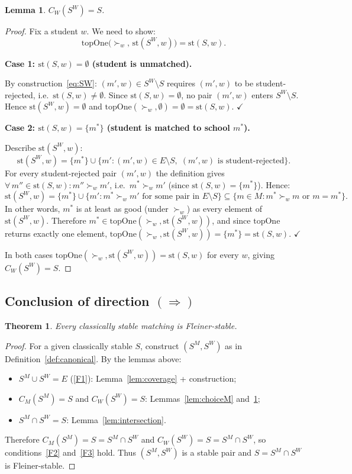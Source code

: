 \documentclass[12pt, a4paper]{article}
\theoremstyle{definition}
\theoremstyle{plain}
\newtheorem{theorem}[definition]{Theorem}
\newtheorem{lemma}[definition]{Lemma}
\theoremstyle{remark}
\newcommand{\CM}{C_M}
\newcommand{\CW}{C_W}
\newcommand{\SM}{S^M}
\newcommand{\SW}{S^W}
\newcommand{\stud}[2]{\mathrm{st}(#1,#2)}
\newcommand{\topOne}{\mathrm{topOne}}
\begin{document}
\begin{lemma}
\label{lem:choiceW}
$\CW(\SW) = S$.
\end{lemma}
\begin{proof}
Fix a student $w$. We need to show:
\[
  \topOne\bigl(\succ_w,\,\stud{\SW}{w}\bigr) = \stud{S}{w}.
\]

\textbf{Case 1: $\stud{S}{w} = \emptyset$ (student is unmatched).}

By construction~\eqref{eq:SW}: $(m', w) \in \SW \setminus S$ requires
$(m', w)$ to be student-rejected, i.e.\ $\stud{S}{w} \neq \emptyset$.
Since $\stud{S}{w} = \emptyset$, no pair $(m', w)$ enters $\SW \setminus S$.
Hence $\stud{\SW}{w} = \emptyset$ and
$\topOne(\succ_w, \emptyset) = \emptyset = \stud{S}{w}$. $\checkmark$

\textbf{Case 2: $\stud{S}{w} = \{m^*\}$ (student is matched to school $m^*$).}

Describe $\stud{\SW}{w}$:
\[
  \stud{\SW}{w} = \{m^*\} \cup
  \bigl\{m' : (m', w) \in E \setminus S,\;
  (m', w)\text{ is student-rejected}\bigr\}.
\]
For every student-rejected pair $(m', w)$ the definition gives
$\forall\, m'' \in \stud{S}{w} : m'' \succ_w m'$, i.e.\ $m^* \succ_w m'$
(since $\stud{S}{w} = \{m^*\}$). Hence:
\[
  \stud{\SW}{w}
  = \{m^*\} \cup \{m' : m^* \succ_w m'\text{ for some pair in }E \setminus S\}
  \subseteq \{m \in M : m^* \succ_w m \text{ or } m = m^*\}.
\]
In other words, $m^*$ is at least as good (under $\succ_w$) as every element
of $\stud{\SW}{w}$. Therefore $m^* \in \topOne(\succ_w, \stud{\SW}{w})$, and
since $\topOne$ returns exactly one element,
$\topOne(\succ_w, \stud{\SW}{w}) = \{m^*\} = \stud{S}{w}$. $\checkmark$

\medskip
In both cases $\topOne(\succ_w, \stud{\SW}{w}) = \stud{S}{w}$ for every $w$,
giving $\CW(\SW) = S$.
\end{proof}

\subsection{Conclusion of direction $(\Rightarrow)$}

\begin{theorem}
\label{thm:classical_to_fleiner}
Every classically stable matching is Fleiner-stable.
\end{theorem}
\begin{proof}
For a given classically stable $S$, construct $(\SM, \SW)$ as in
Definition~\ref{def:canonical}. By the lemmas above:
\begin{itemize}
  \item $\SM \cup \SW = E$ (\ref{F1}): Lemma~\ref{lem:coverage} + construction;
  \item $\CM(\SM) = S$ and $\CW(\SW) = S$: Lemmas~\ref{lem:choiceM}
    and~\ref{lem:choiceW};
  \item $\SM \cap \SW = S$: Lemma~\ref{lem:intersection}.
\end{itemize}
Therefore $\CM(\SM) = S = \SM \cap \SW$ and $\CW(\SW) = S = \SM \cap \SW$,
so conditions~\eqref{F2} and~\eqref{F3} hold. Thus $(\SM, \SW)$ is a stable
pair and $S = \SM \cap \SW$ is Fleiner-stable.
\end{proof}
\end{document}

